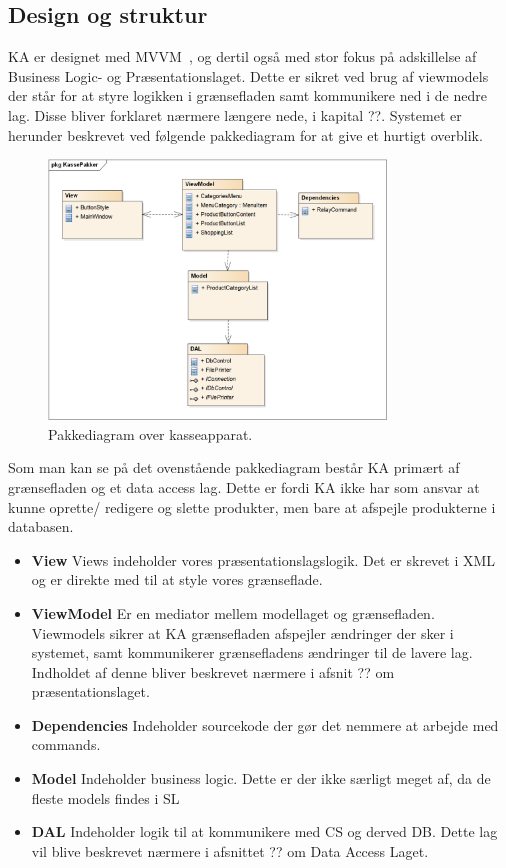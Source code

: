 \subsection{Design og struktur}
\gls{KA} er designet med MVVM~\cite{MVVM}, og dertil også med stor fokus på adskillelse af Business Logic- og Præsentationslaget. Dette er sikret ved brug af viewmodels der står for at styre logikken i grænsefladen samt kommunikere ned i de nedre lag. Disse bliver forklaret nærmere længere nede, i kapital ??.
Systemet er herunder beskrevet ved følgende pakkediagram for at give et hurtigt overblik.	

\begin{figure}[H]
	\centering
	\includegraphics[width=0.8\textwidth]{Systemdesign/Frontend/pics/KassePakker}
	\caption{Pakkediagram over kasseapparat.}
	\label{fig:EndeligeGUI}
\end{figure}

Som man kan se på det ovenstående pakkediagram består \gls{KA} primært af grænsefladen og et data access lag. Dette er fordi \gls{KA} ikke har som ansvar at kunne oprette/ redigere og slette produkter, men bare at afspejle produkterne i databasen. 

\begin{itemize}
	\item \textbf{View} Views indeholder vores præsentationslagslogik. Det er skrevet i XML og er direkte med til at style vores grænseflade.
	\item \textbf{ViewModel} Er en mediator mellem modellaget og grænsefladen. Viewmodels sikrer at \gls{KA} grænsefladen afspejler ændringer der sker i systemet, samt kommunikerer grænsefladens ændringer til de lavere lag. Indholdet af denne bliver beskrevet nærmere i afsnit ?? om præsentationslaget.
	\item \textbf{Dependencies} Indeholder sourcekode der gør det nemmere at arbejde med commands.
	\item \textbf{Model} Indeholder business logic. Dette er der ikke særligt meget af, da de fleste models findes i \gls{SL}
	\item \textbf{DAL} Indeholder logik til at kommunikere med \gls{CS} og derved \gls{DB}. Dette lag vil blive beskrevet nærmere i afsnittet ?? om Data Access Laget.
\end{itemize}



